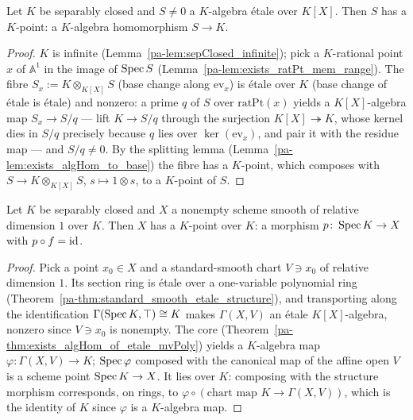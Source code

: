 \begin{theorem}
  \label{pa-thm:exists_algHom_of_etale_mvPoly}
  \leanok

  Let \(K\) be separably closed and \(S \neq 0\) a \(K\)-algebra \'etale over \(K[X]\).
  Then \(S\) has a \(K\)-point: a \(K\)-algebra homomorphism \(S \to K\).
\end{theorem}
\begin{proof}
  \leanok
  \(K\) is infinite (Lemma~\ref{pa-lem:sepClosed_infinite}); pick a \(K\)-rational point
  \(x\) of \(\mathbb{A}^1\) in the image of \(\operatorname{Spec} S\)
  (Lemma~\ref{pa-lem:exists_ratPt_mem_range}). The fibre
  \(S_x := K \otimes_{K[X]} S\) (base change along \(\mathrm{ev}_x\)) is \'etale over \(K\)
  (base change of \'etale is \'etale) and nonzero: a prime \(q\) of \(S\) over
  \(\mathrm{ratPt}(x)\) yields a \(K[X]\)-algebra map \(S_x \to S/q\) — lift
  \(K \to S/q\) through the surjection \(K[X] \twoheadrightarrow K\), whose kernel dies in
  \(S/q\) precisely because \(q\) lies over \(\ker(\mathrm{ev}_x)\), and pair it with the
  residue map — and \(S/q \neq 0\). By the splitting lemma
  (Lemma~\ref{pa-lem:exists_algHom_to_base}) the fibre has a \(K\)-point, which composes with
  \(S \to K \otimes_{K[X]} S\), \(s \mapsto 1 \otimes s\), to a \(K\)-point of \(S\).
\end{proof}

\begin{theorem}
  \label{pa-thm:exists_rationalPoint_sepClosed}
  \leanok

  Let \(K\) be separably closed and \(X\) a nonempty scheme smooth of relative dimension
  \(1\) over \(K\). Then \(X\) has a \(K\)-point over \(K\): a morphism
  \(p \colon \operatorname{Spec} K \to X\) with \(p \circ f = \operatorname{id}\).
\end{theorem}
\begin{proof}
  \leanok
  Pick a point \(x_0 \in X\) and a standard-smooth chart \(V \ni x_0\) of relative
  dimension \(1\). Its section ring is \'etale over a one-variable polynomial ring
  (Theorem~\ref{pa-thm:standard_smooth_etale_structure}), and transporting along the
  identification \(\Gamma(\operatorname{Spec} K, \top) \cong K\) makes \(\Gamma(X, V)\) an \'etale
  \(K[X]\)-algebra, nonzero since \(V \ni x_0\) is nonempty. The core
  (Theorem~\ref{pa-thm:exists_algHom_of_etale_mvPoly}) yields a \(K\)-algebra map
  \(\varphi \colon \Gamma(X,V) \to K\); \(\operatorname{Spec}\varphi\) composed with the canonical map of
  the affine open \(V\) is a scheme point \(\operatorname{Spec} K \to X\). It lies over \(K\): composing
  with the structure morphism corresponds, on rings, to
  \(\varphi \circ (\text{chart map } K \to \Gamma(X,V))\), which is the identity of \(K\)
  since \(\varphi\) is a \(K\)-algebra map.
\end{proof}

